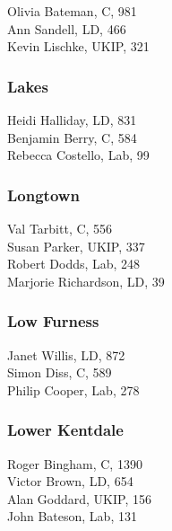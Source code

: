 \documentclass[a4paper,openany,10pt]{book}
\begin{document}


Olivia Bateman, C, 981\\
Ann Sandell, LD, 466\\
Kevin Lischke, UKIP, 321\\


\subsubsection*{Lakes}



Heidi Halliday, LD, 831\\
Benjamin Berry, C, 584\\
Rebecca Costello, Lab, 99\\


\subsubsection*{Longtown}



Val Tarbitt, C, 556\\
Susan Parker, UKIP, 337\\
Robert Dodds, Lab, 248\\
Marjorie Richardson, LD, 39\\


\subsubsection*{Low Furness}



Janet Willis, LD, 872\\
Simon Diss, C, 589\\
Philip Cooper, Lab, 278\\


\subsubsection*{Lower Kentdale}



Roger Bingham, C, 1390\\
Victor Brown, LD, 654\\
Alan Goddard, UKIP, 156\\
John Bateson, Lab, 131\\
\end{document}
